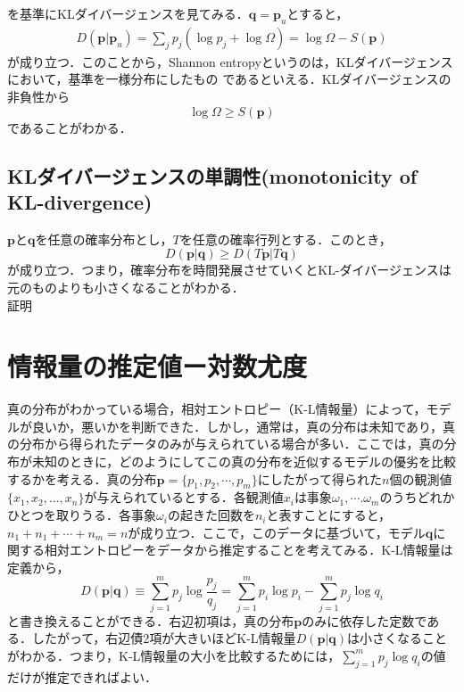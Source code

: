 を基準にKLダイバージェンスを見てみる．$\bm{q}=\bm{p}_u$とすると，
\begin{align}
    D(\bm{p}|\bm{p}_u)=\sum_j p_j(\log{p_j}+\log{\Omega})=\log{\Omega}-S(\bm{p})
\end{align}
が成り立つ．このことから，Shannon entropyというのは，KLダイバージェンスにおいて，基準を一様分布にしたもの
であるといえる．KLダイバージェンスの非負性から
\begin{equation}
    \log{\Omega}\geq S(\bm{p})
\end{equation}
であることがわかる．





\subsection{KLダイバージェンスの単調性(monotonicity of KL-divergence)}
$\bm{p}$と$\bm{q}$を任意の確率分布とし，$T$を任意の確率行列とする．このとき，
\begin{equation}
    D(\bm{p}|\bm{q})\geq D(T\bm{p}|T\bm{q})
\end{equation}
が成り立つ．つまり，確率分布を時間発展させていくとKL-ダイバージェンスは元のものよりも小さくなることがわかる．\\
証明\\





\section{情報量の推定値ー対数尤度}
真の分布がわかっている場合，相対エントロピー（K-L情報量）によって，モデルが良いか，悪いかを判断できた．しかし，通常は，真の分布は未知であり，真の分布から得られたデータのみが与えられている場合が多い．ここでは，真の分布が未知のときに，どのようにしてこの真の分布を近似するモデルの優劣を比較するかを考える．真の分布$\bm{p}=\{p_1,p_2,\cdots,p_m\}$にしたがって得られた$n$個の観測値$\{x_1,x_2,\ldots,x_n\}$が与えられているとする．各観測値$x_i$は事象$\omega_1,\cdots.\omega_m$のうちどれかひとつを取りうる．各事象$\omega_i$の起きた回数を$n_i$と表すことにすると，$n_1+n_1+\cdots+n_m=n$が成り立つ．ここで，このデータに基づいて，モデル$\bm{q}$に関する相対エントロピーをデータから推定することを考えてみる．K-L情報量は定義から，
\begin{equation}
    D(\bm{p}|\bm{q})\equiv\sum_{j=1}^{m}p_j\log{\frac{p_j}{q_j}}
    =\sum_{j=1}^{m}p_i\log{p_i}-\sum_{j=1}^{m}p_j\log{q_i}
\end{equation}
と書き換えることができる．右辺初項は，真の分布$\bm{p}$のみに依存した定数である．したがって，右辺債2項が大きいほどK-L情報量$D(\bm{p}|\bm{q})$は小さくなることがわかる．つまり，K-L情報量の大小を比較するためには，$\sum_{j=1}^{m}p_j\log{q_i}$の値だけが推定できればよい．















\section{}
